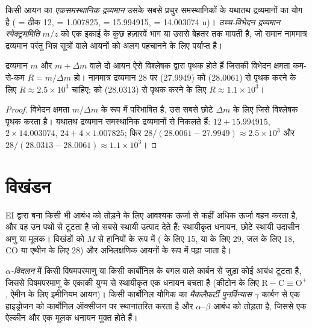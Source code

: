 \begin{definition}[यथातथ द्रव्यमान]\label{def:b2:mass-spec-atomic:exact-mass}
किसी आयन का \emph{एकसमस्थानिक द्रव्यमान} उसके सबसे प्रचुर
समस्थानिकों के यथातथ द्रव्यमानों का योग है ( = ठीक 12,  = 1.007825,  = 15.994915,
 = 14.003074 u)। \emph{उच्च-विभेदन द्रव्यमान स्पेक्ट्रममिति}
$m/z$ को एक इकाई के कुछ हज़ारवें भाग या उससे बेहतर तक मापती है, जो समान
नाममात्र द्रव्यमान परंतु भिन्न सूत्रों वाले आयनों को अलग पहचानने के लिए पर्याप्त है।
\end{definition}

\begin{proposition}[विभेदन क्षमता]\label{prop:b2:mass-spec-atomic:resolving}
द्रव्यमान $m$ और $m + \Delta m$ वाले दो आयन ऐसे विश्लेषक द्वारा पृथक होते हैं जिसकी विभेदन क्षमता कम-से-कम
$R = m/\Delta m$ हो। नाममात्र द्रव्यमान 28 पर  (27.9949) को  (28.0061) से पृथक करने के लिए $R
\approx 2.5 \times 10^3$ चाहिए;  को  (28.0313) से पृथक करने के लिए $R \approx 1.1 \times 10^3$।
\end{proposition}

\begin{proof}
विभेदन क्षमता $m/\Delta m$ के रूप में परिभाषित है, उस सबसे छोटे $\Delta m$ के लिए जिसे विश्लेषक पृथक करता है।
यथातथ द्रव्यमान समस्थानिक द्रव्यमानों से निकलते हैं: $12 + 15.994915$, $2 \times 14.003074$, $24 + 4 \times
1.007825$; फिर $28/(28.0061 - 27.9949) \approx 2.5 \times 10^3$ और $28/(28.0313 - 28.0061) \approx
1.1 \times 10^3$।
\end{proof}

\section{विखंडन}

EI द्वारा बना  किसी भी आबंध को तोड़ने के लिए आवश्यक ऊर्जा से कहीं अधिक ऊर्जा वहन करता है, और वह
उन पथों से टूटता है जो सबसे स्थायी उत्पाद देते हैं: स्थायीकृत धनायन, छोटे स्थायी उदासीन अणु या
मूलक। विखंडों को $M$ से हानियों के रूप में ( के लिए 15,  या  के लिए 29,
जल के लिए 18, CO या एथीन के लिए 28) और अभिलक्षणिक आयनों के रूप में पढ़ा जाता है।

\begin{definition}[दो विखंडन]\label{def:b2:mass-spec-atomic:fragmentation}
\emph{$\alpha$-विदलन} में किसी विषमपरमाणु या किसी कार्बोनिल के बगल वाले कार्बन से
जुड़ा कोई आबंध टूटता है, जिससे विषमपरमाणु के एकाकी युग्म से स्थायीकृत एक धनायन बचता है (कीटोन के लिए
 $\mathrm{R{-}C{\equiv}O^+}$, ऐमीन के लिए इमीनियम आयन)। किसी कार्बोनिल यौगिक का \emph{मैकलैफ़र्टी
पुनर्विन्यास} $\gamma$ कार्बन से एक हाइड्रोजन को कार्बोनिल ऑक्सीजन पर स्थानांतरित करता है
और $\alpha$--$\beta$ आबंध को तोड़ता है, जिससे एक ऐल्कीन और एक
 मूलक धनायन मुक्त होते हैं।
\end{definition}

